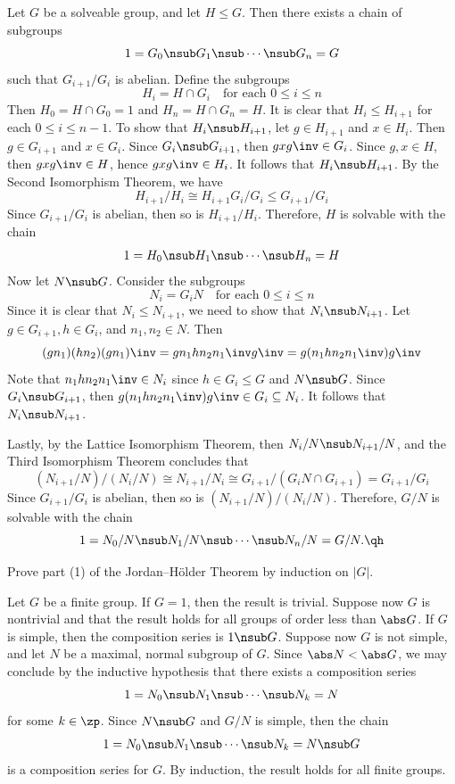 \begin{sol}
    Let $G$ be a solveable group, and let $H \leq G$. Then there exists a chain of subgroups
    \[1 = G_0 \nsub G_1 \nsub \cdots \nsub G_n = G\]
    such that $G_{i + 1}/G_i$ is abelian. Define the subgroups
    \[H_i = H \cap G_i \quad \text{for each $0 \leq i \leq n$}\]
    Then $H_0 = H \cap G_0 = 1$ and $H_n = H \cap G_n = H$. It is clear that $H_i \leq H_{i + 1}$ for each $0 \leq i \leq n - 1$. To show that $H_i \nsub H_{i + 1}$, let $g \in H_{i + 1}$ and $x \in H_i$. Then $g \in G_{i + 1}$ and $x \in G_i$. Since $G_i \nsub G_{i + 1}$, then $gxg\inv \in G_i$. Since $g, x \in H$, then $gxg\inv \in H$, hence $gxg\inv \in H_i$. It follows that $H_i \nsub H_{i + 1}$. By the Second Isomorphism Theorem, we have
    \[H_{i + 1}/H_i \cong H_{i + 1}G_i/G_i \leq G_{i + 1}/G_i\]
    Since $G_{i + 1}/G_i$ is abelian, then so is $H_{i + 1}/H_i$. Therefore, $H$ is solvable with the chain
    \[1 = H_0 \nsub H_1 \nsub \cdots \nsub H_n = H\]
    Now let $N \nsub G$. Consider the subgroups
    \[N_i = G_iN \quad \text{for each $0 \leq i \leq n$}\]
    Since it is clear that $N_i \leq N_{i + 1}$, we need to show that $N_i \nsub N_{i + 1}$. Let $g \in G_{i + 1}, h \in G_i$, and $n_1, n_2 \in N$. Then
    \[(gn_1)(hn_2)(gn_1)\inv = g n_1 h n_2 n_1\inv g\inv = g(n_1 h n_2 n_1\inv)g \inv\]
    Note that $n_1 hn_2n_1\inv \in N_i$ since $h \in G_i \leq G$ and $N \nsub G$. Since $G_i \nsub G_{i + 1}$, then $g(n_1 h n_2 n_1\inv)g \inv \in G_i \subseteq N_i$. It follows that $N_i \nsub N_{i + 1}$.

    Lastly, by the Lattice Isomorphism Theorem, then $N_i/N \nsub N_{i + 1}/N$, and the Third Isomorphism Theorem concludes that
    \[(N_{i + 1}/N)/(N_i/N) \cong N_{i + 1}/N_i \cong G_{i + 1}/(G_iN \cap G_{i + 1}) = G_{i + 1}/G_i\]
    Since $G_{i + 1}/G_i$ is abelian, then so is $(N_{i + 1}/N)/(N_i/N)$. Therefore, $G/N$ is solvable with the chain
    \[1 = N_0/N \nsub N_1/N \nsub \cdots \nsub N_n/N = G/N. \qh\]
\end{sol}

\newpage

\begin{exercise}\label{ex3.4.6}
    Prove part (1) of the Jordan--H\"older Theorem by induction on $|G|$.
\end{exercise}

\begin{sol}
    Let $G$ be a finite group. If $G = 1$, then the result is trivial. Suppose now $G$ is nontrivial and that the result holds for all groups of order less than $\abs G$. If $G$ is simple, then the composition series is $1 \nsub G$. Suppose now $G$ is not simple, and let $N$ be a maximal, normal subgroup of $G$. Since $\abs N < \abs G$, we may conclude by the inductive hypothesis that there exists a composition series
    \[1 = N_0 \nsub N_1 \nsub \cdots \nsub N_k = N\]
    for some $k \in \zp$. Since $N \nsub G$ and $G/N$ is simple, then the chain
    \[1 = N_0 \nsub N_1 \nsub \cdots \nsub N_k = N \nsub G\]
    is a composition series for $G$. By induction, the result holds for all finite groups.
\end{sol}

